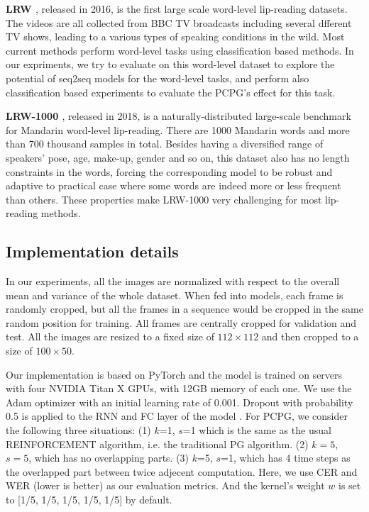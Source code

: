 \documentclass[a4paper, 10pt, conference]{ieeeconf}      %
\begin{document}
{\bf LRW \cite{B2017}}, released in 2016, is the first large scale word-level lip-reading datasets. The videos are all collected from BBC TV broadcasts including several dfferent TV shows, leading to a various types of speaking conditions in the wild. Most current methods perform word-level tasks using classification based methods. In our expriments, we try to evaluate on this word-level dataset to explore the potential of seq2seq models for the word-level tasks, and perform also classification based experiments to evaluate the PCPG's effect for this task.

{\bf LRW-1000 \cite{Yang2019}}, released in 2018, is a naturally-distributed large-scale benchmark for Mandarin word-level lip-reading. There are 1000 Mandarin words and more than 700 thousand samples in total. Besides having a diversified range of speakers' pose, age, make-up, gender and so on, this dataset also has no length constraints in the words, forcing the corresponding model to be robust and adaptive to practical case where some words are indeed more or less frequent than others. These properties make LRW-1000 very challenging for most lip-reading methods. %

\subsection{Implementation details}
In our experiments, all the images are normalized with respect to the overall mean and variance of the whole dataset. When fed into models, each frame is randomly cropped, but all the frames in a sequence would be cropped in the same random position for training. All frames are centrally cropped for validation and test. All the images are resized to a fixed size of $112\times112$ and then cropped to a size of $100\times50$. %

Our implementation is based on PyTorch and the model is trained on servers with four NVIDIA Titan X GPUs, with 12GB memory of each one. We use the Adam optimizer with an initial learning rate of 0.001. Dropout with probability 0.5 is applied to the RNN and FC layer of the model . %
For PCPG, we consider the following three situations: (1) $k$=1, $s$=1 which is the same as the usual REINFORCEMENT algorithm, i.e. the traditional PG algorithm. (2) $k=5$, $s=5$, which has no overlapping parts. (3) $k$=5, $s$=1, which has 4 time steps as the overlapped part between twice adjecent computation. Here, we use CER and WER (lower is better) as our evaluation metrics. And the kernel's weight $w$ is set to [1/5, 1/5, 1/5, 1/5, 1/5] by default.
\vspace{0.2cm}
\end{document}
